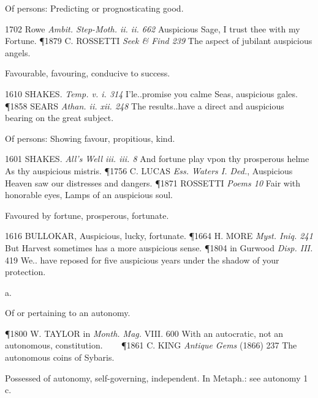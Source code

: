\begin{description}[wide, labelwidth=!, labelindent=0pt]
\begin{myenumerate}
 Of persons: Predicting or prognosticating good. 

1702 Rowe \textit{Ambit. Step-Moth. ii. ii. 662} Auspicious Sage, I trust 
thee with my Fortune. 
\P 1879 C. ROSSETTI \textit{Seek \& Find 239} The aspect of jubilant auspicious
angels.

 Favourable, favouring, conducive to success. 

1610 SHAKES. \textit{Temp. v. i. 314} I'le..promise you calme Seas, 
auspicious gales.
\P 1858 SEARS \textit{Athan. ii. xii. 248} The results..have a direct and 
auspicious bearing on the great subject.

 Of persons: Showing favour, propitious, kind. 

1601 SHAKES. \textit{All's Well iii. iii. 8} And fortune play vpon thy prosperous
helme As thy auspicious mistris. 
\P 1756 C. LUCAS \textit{Ess. Waters I. Ded.}, Auspicious Heaven saw our distresses 
and dangers. 
\P 1871 ROSSETTI \textit{Poems 10} Fair with honorable eyes, Lamps of an auspicious 
soul.

 Favoured by fortune, prosperous, fortunate. 

1616 BULLOKAR, Auspicious, lucky, fortunate. 
\P 1664 H. MORE \textit{Myst. Iniq. 241} But Harvest sometimes has a more 
auspicious sense. 
\P 1804 in Gurwood \textit{Disp. III.} 419 We.. have reposed for five auspicious 
years under the shadow of your protection.
\end{myenumerate}





 a.

\noindent {}

\vspace{-0.3cm}

\begin{myenumerate}

 Of or pertaining to an autonomy.

\P 1800 W. TAYLOR  in \textit{Month. Mag.} VIII. 600 With an autocratic, not an autonomous, constitution.    
\P 1861 C. KING  \textit{Antique Gems} (1866) 237 The autonomous coins of Sybaris.

 Possessed of autonomy, self-governing, independent. In Metaph.: see autonomy 1 c.


\end{myenumerate}
\end{description}
